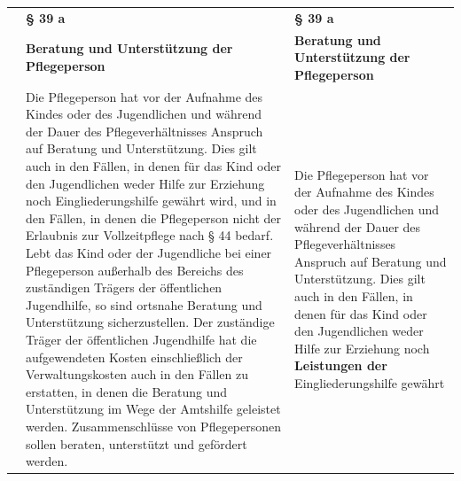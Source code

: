 \documentclass[10pt,a4paper,landscape]{article}
\begin{document}
\begin{longtable}{|L{8.2cm}|L{8.2cm}|L{8.2cm}|}
\hhline{|---|}
 & \textbf{\S{} 39 a} & \textbf{\S{} 39 a} \\
\hhline{|---|}
 & \textbf{Beratung und Unterstützung der  \newline Pflegeperson } & \textbf{Beratung und Unterstützung der  \newline Pflegeperson } \\
\hhline{|---|}
 & Die Pflegeperson hat vor der Aufnahme  \newline des Kindes oder des Jugendlichen und  \newline während der Dauer des  \newline Pflegeverhältnisses Anspruch auf Beratung  \newline und Unterstützung. Dies gilt auch in den  \newline Fällen, in denen für das Kind oder den  \newline Jugendlichen weder Hilfe zur Erziehung  \newline noch Eingliederungshilfe gewährt \textcolor{diffred}{wird,} und  \newline in den Fällen, in denen die Pflegeperson  \newline nicht der Erlaubnis zur Vollzeitpflege nach  \newline \S{} 44 bedarf. Lebt das Kind oder der  \newline Jugendliche bei einer Pflegeperson  \newline außerhalb des Bereichs des zuständigen  \newline Trägers der öffentlichen Jugendhilfe, so  \newline sind ortsnahe Beratung und Unterstützung  \newline sicherzustellen. Der zuständige Träger der  \newline öffentlichen Jugendhilfe hat die  \newline aufgewendeten Kosten einschließlich der  \newline Verwaltungskosten auch in den Fällen zu  \newline erstatten, in denen die Beratung und  \newline Unterstützung im Wege der Amtshilfe  \newline geleistet werden. Zusammenschlüsse von  \newline Pflegepersonen sollen beraten, unterstützt  \newline und gefördert werden. & Die Pflegeperson hat vor der Aufnahme  \newline des Kindes oder des Jugendlichen und  \newline während der Dauer des  \newline Pflegeverhältnisses Anspruch auf Beratung  \newline und Unterstützung. Dies gilt auch in den  \newline Fällen, in denen für das Kind oder den  \newline Jugendlichen weder Hilfe zur Erziehung  \newline noch \textbf{\textcolor{diffgreen}{Leistungen der}} Eingliederungshilfe  \newline gewährt 
\end{longtable}
\end{document}
